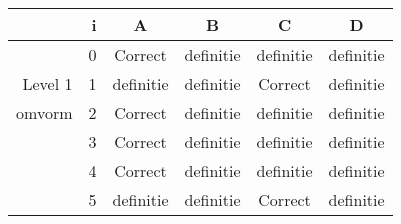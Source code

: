\begin{tabular}{ rr| c|c|c|c}\hline\hline
     & i & \textbf{A} & \textbf{B} & \textbf{C} & \textbf{D}\\\hline

&0&Correct\cellcolor[gray]{0.6}&definitie&definitie&definitie\\
Level 1 & 1&definitie&definitie&Correct\cellcolor[gray]{0.6}&definitie\\
omvorm &2&Correct\cellcolor[gray]{0.6}&definitie&definitie&definitie\\
&3&Correct\cellcolor[gray]{0.6}&definitie&definitie&definitie\\
&4&Correct\cellcolor[gray]{0.6}&definitie&definitie&definitie\\
&5&definitie&definitie&Correct\cellcolor[gray]{0.6}&definitie\\
\hline\end{tabular}\par\ \newline

